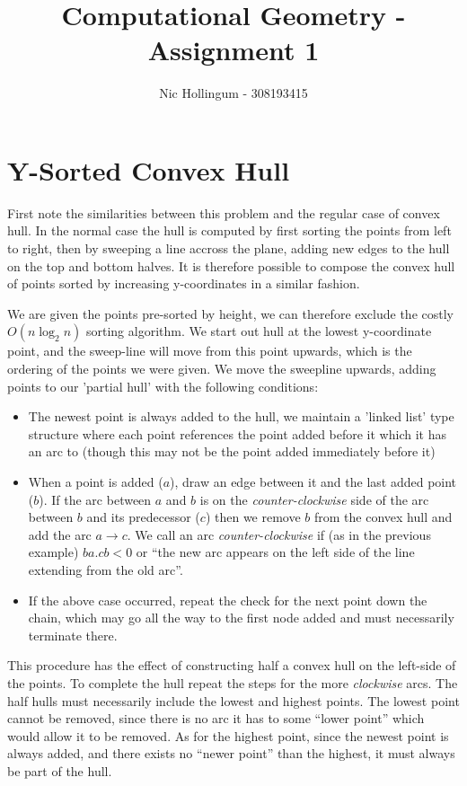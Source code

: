 
\author{Nic Hollingum - 308193415}
\title{Computational Geometry - Assignment 1}

\addtolength{\oddsidemargin}{-.875in}
\addtolength{\evensidemargin}{-.875in}
\addtolength{\textwidth}{1.75in}
\addtolength{\topmargin}{-.875in}
\addtolength{\textheight}{1.75in}


\maketitle

\section {Y-Sorted Convex Hull}

First note the similarities between this problem and the regular case of convex hull.
In the normal case the hull is computed by first sorting the points from left to right, then by sweeping a line accross the plane, adding new edges to the hull on the top and bottom halves.
It is therefore possible to compose the convex hull of points sorted by increasing y-coordinates in a similar fashion.

We are given the points pre-sorted by height, we can therefore exclude the costly $O(n \log_{2} n)$ sorting algorithm.
We start out hull at the lowest y-coordinate point, and the sweep-line will move from this point upwards, which is the ordering of the points we were given.
We move the sweepline upwards, adding points to our 'partial hull' with the following conditions:
\begin{itemize}
	\item The newest point is always added to the hull, we maintain a 'linked list' type structure where each point references the point added before it which it has an arc to (though this may not be the point added immediately before it)
	\item When a point is added ($a$), draw an edge between it and the last added point ($b$).  If the arc between $a$ and $b$ is on the {\em counter-clockwise} side of the arc between $b$ and its predecessor ($c$) then we remove $b$ from the convex hull and add the arc $a \rightarrow c$.  We call an arc {\em counter-clockwise} if (as in the previous example) $ba . cb < 0$ or ``the new arc appears on the left side of the line extending from the old arc''.
	\item If the above case occurred, repeat the check for the next point down the chain, which may go all the way to the first node added and must necessarily terminate there.
\end{itemize}
This procedure has the effect of constructing half a convex hull on the left-side of the points.
To complete the hull repeat the steps for the more {\em clockwise} arcs.
The half hulls must necessarily include the lowest and highest points.
The lowest point cannot be removed, since there is no arc it has to some ``lower point'' which would allow it to be removed.
As for the highest point, since the newest point is always added, and there exists no ``newer point'' than the highest, it must always be part of the hull.

